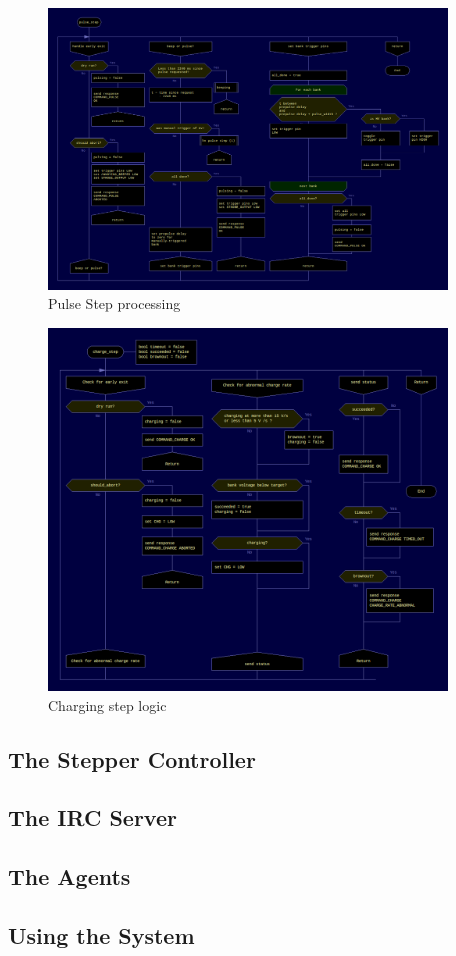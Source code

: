 \begin{figure}
  \includegraphics[width=400px]{pulse_step.png}
\caption{\label{fig:pulse_step} Pulse Step processing}
\end{figure}

\begin{figure}
  \includegraphics[width=400px]{charge_step.png}
\caption{\label{fig:charge_step} Charging step logic}
\end{figure}


\subsection{The Stepper Controller}
\subsection{The IRC Server}
\subsection{The Agents}
\subsection{Using the System}
